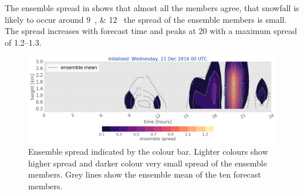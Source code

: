 %

%
\newline \noindent
The ensemble spread in  shows that almost all the members agree, that snowfall is likely to occur around \SIlist{9;12}{\UTC} the spread of the ensemble members is small. The spread increases with forecast time and peaks at \SI{20}{\UTC} with a maximum spread of \SIrange{1.2}{1.3}{\SWC}. 
% 
\begin{figure}[h]
	\includegraphics[width=\textwidth]{./fig_ensemble_spread/20161221}
	\caption{Ensemble spread indicated by the colour bar. Lighter colours show higher spread and darker colour very small spread of the ensemble members. Grey lines show the ensemble mean of the ten forecast members.}\label{fig:spread21}
\end{figure}
%
